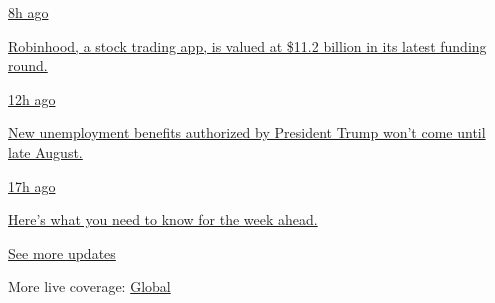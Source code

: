 \href{https://www.nytimes3xbfgragh.onion/live/2020/08/17/business/stock-market-today-coronavirus?action=click\&pgtype=Article\&state=default\&region=MAIN_CONTENT_1\&context=storylines_live_updates\#robinhood-a-stock-trading-app-is-valued-at-11-2-billion-in-its-latest-funding-round}{8h
ago}

\href{https://www.nytimes3xbfgragh.onion/live/2020/08/17/business/stock-market-today-coronavirus?action=click\&pgtype=Article\&state=default\&region=MAIN_CONTENT_1\&context=storylines_live_updates\#robinhood-a-stock-trading-app-is-valued-at-11-2-billion-in-its-latest-funding-round}{Robinhood,
a stock trading app, is valued at \$11.2 billion in its latest funding
round.}

\href{https://www.nytimes3xbfgragh.onion/live/2020/08/17/business/stock-market-today-coronavirus?action=click\&pgtype=Article\&state=default\&region=MAIN_CONTENT_1\&context=storylines_live_updates\#new-unemployment-benefits-authorized-by-president-trump-wont-come-until-late-august}{12h
ago}

\href{https://www.nytimes3xbfgragh.onion/live/2020/08/17/business/stock-market-today-coronavirus?action=click\&pgtype=Article\&state=default\&region=MAIN_CONTENT_1\&context=storylines_live_updates\#new-unemployment-benefits-authorized-by-president-trump-wont-come-until-late-august}{New
unemployment benefits authorized by President Trump won't come until
late August.}

\href{https://www.nytimes3xbfgragh.onion/live/2020/08/17/business/stock-market-today-coronavirus?action=click\&pgtype=Article\&state=default\&region=MAIN_CONTENT_1\&context=storylines_live_updates\#heres-what-you-need-to-know-for-the-week-ahead}{17h
ago}

\href{https://www.nytimes3xbfgragh.onion/live/2020/08/17/business/stock-market-today-coronavirus?action=click\&pgtype=Article\&state=default\&region=MAIN_CONTENT_1\&context=storylines_live_updates\#heres-what-you-need-to-know-for-the-week-ahead}{Here's
what you need to know for the week ahead.}

\href{https://www.nytimes3xbfgragh.onion/live/2020/08/17/business/stock-market-today-coronavirus?action=click\&pgtype=Article\&state=default\&region=MAIN_CONTENT_1\&context=storylines_live_updates}{See
more updates}

More live coverage:
\href{https://www.nytimes3xbfgragh.onion/2020/08/17/world/coronavirus-covid.html?action=click\&pgtype=Article\&state=default\&region=MAIN_CONTENT_1\&context=storylines_live_updates}{Global}

